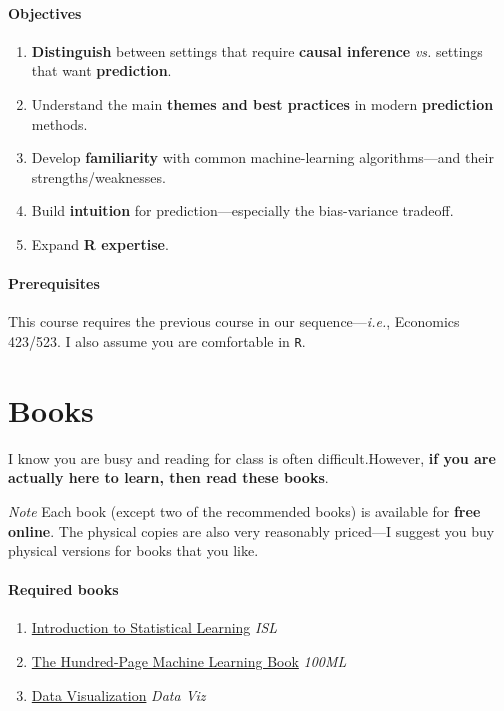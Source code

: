 \documentclass[10pt]{article}
\newcommand{\emf}[1]{\textbf{\textcolor{grass_green}{#1}}}
\begin{document}
\paragraph{Objectives}

\begin{enumerate}
  \item \emf{Distinguish} between settings that require \emf{causal inference} \textit{vs.} settings that want \emf{prediction}.
  \item Understand the main \emf{themes and best practices} in modern \emf{prediction} methods.
  \item Develop \emf{familiarity} with common machine-learning algorithms---and their strengths/weaknesses.
  \item Build \emf{intuition} for prediction---especially the bias-variance tradeoff.
  \item Expand \emf{R expertise}.
\end{enumerate}

\paragraph{Prerequisites} This course requires the previous course in our sequence---\textit{i.e.}, Economics 423/523. I also assume you are comfortable in \texttt{R}.

\section*{Books} I know you are busy and reading for class is often difficult.\newline However, \emf{if you are actually here to learn, then read these books}.

\bigskip

\noindent\textit{Note} Each book (except two of the recommended books) is available for \emf{free online}. The physical copies are also very reasonably priced---I suggest you buy physical versions for books that you like.

\paragraph{Required books}

\begin{enumerate}
\item \href{https://www.statlearning.com/}{Introduction to Statistical Learning} \textit{ISL}
\item \href{http://themlbook.com/}{The Hundred-Page Machine Learning Book} \textit{100ML}
\item \href{https://socviz.co/}{Data Visualization} \textit{Data Viz}
\end{enumerate}
\end{document}
